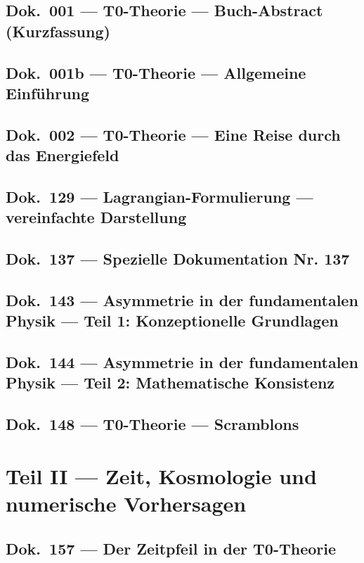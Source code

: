 	\chapter{Dok.~001 --- T0-Theorie — Buch-Abstract (Kurzfassung)}
	
	\chapter{Dok.~001b --- T0-Theorie — Allgemeine Einführung}
	
	\chapter{Dok.~002 --- T0-Theorie — Eine Reise durch das Energiefeld}
	
	\chapter{Dok.~129 --- Lagrangian-Formulierung — vereinfachte Darstellung}
	
	\chapter{Dok.~137 --- Spezielle Dokumentation Nr. 137}
	
	\chapter{Dok.~143 --- Asymmetrie in der fundamentalen Physik — Teil 1: Konzeptionelle Grundlagen}
	
	\chapter{Dok.~144 --- Asymmetrie in der fundamentalen Physik — Teil 2: Mathematische Konsistenz}
	
	\chapter{Dok.~148 --- T0-Theorie — Scramblons}
	
	\part{Teil II --- Zeit, Kosmologie und numerische Vorhersagen}
	\chapter{Dok.~157 --- Der Zeitpfeil in der T0-Theorie}
	

